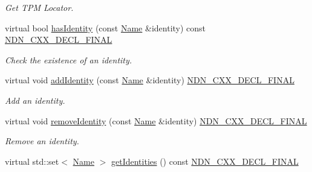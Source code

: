 \begin{DoxyCompactItemize}
\begin{DoxyCompactList}\small\item\em Get T\+PM Locator. \end{DoxyCompactList}\item 
virtual bool \hyperlink{classndn_1_1security_1_1PibSqlite3_ad322c524755fffae64d5fb78f2215c4e}{has\+Identity} (const \hyperlink{classndn_1_1Name}{Name} \&identity) const \hyperlink{ndn-cxx_2src_2common_8hpp_ab53a383abb72682805543301b5f2c244}{N\+D\+N\+\_\+\+C\+X\+X\+\_\+\+D\+E\+C\+L\+\_\+\+F\+I\+N\+AL}
\begin{DoxyCompactList}\small\item\em Check the existence of an identity. \end{DoxyCompactList}\item 
virtual void \hyperlink{classndn_1_1security_1_1PibSqlite3_a4b43db6f4edbc5866ed600d5834e64d2}{add\+Identity} (const \hyperlink{classndn_1_1Name}{Name} \&identity) \hyperlink{ndn-cxx_2src_2common_8hpp_ab53a383abb72682805543301b5f2c244}{N\+D\+N\+\_\+\+C\+X\+X\+\_\+\+D\+E\+C\+L\+\_\+\+F\+I\+N\+AL}
\begin{DoxyCompactList}\small\item\em Add an identity. \end{DoxyCompactList}\item 
virtual void \hyperlink{classndn_1_1security_1_1PibSqlite3_a3fd3e18c163ed344ecbcfa69f3b2b88c}{remove\+Identity} (const \hyperlink{classndn_1_1Name}{Name} \&identity) \hyperlink{ndn-cxx_2src_2common_8hpp_ab53a383abb72682805543301b5f2c244}{N\+D\+N\+\_\+\+C\+X\+X\+\_\+\+D\+E\+C\+L\+\_\+\+F\+I\+N\+AL}
\begin{DoxyCompactList}\small\item\em Remove an identity. \end{DoxyCompactList}\item 
virtual std\+::set$<$ \hyperlink{classndn_1_1Name}{Name} $>$ \hyperlink{classndn_1_1security_1_1PibSqlite3_a440a27d7aada344fd09cc6137018263c}{get\+Identities} () const \hyperlink{ndn-cxx_2src_2common_8hpp_ab53a383abb72682805543301b5f2c244}{N\+D\+N\+\_\+\+C\+X\+X\+\_\+\+D\+E\+C\+L\+\_\+\+F\+I\+N\+AL}\hypertarget{classndn_1_1security_1_1PibSqlite3_a440a27d7aada344fd09cc6137018263c}{}\label{classndn_1_1security_1_1PibSqlite3_a440a27d7aada344fd09cc6137018263c}


\end{DoxyCompactItemize}
